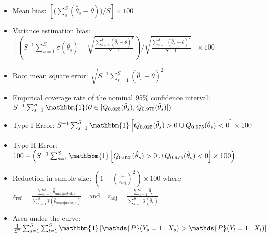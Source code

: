 \documentclass{article}
\begin{document}
  \begin{itemize}[itemsep=16pt]
 \item Mean bias: $  \left[ \big ( \sum_s^{S} (\hat{\theta}_s - \theta)   \big )   \big / S \right] \times 100$ 
  \item Variance estimation bias:  $\left[ \left( S^{-1} \sum_{s=1}^{S} \sigma(\hat{\theta}_s)  - \sqrt{\frac{\sum_{s=1}^{S} (\hat{\theta}_s - \theta)^2}{S-1}} \right) \big / \sqrt{\frac{\sum_{s=1}^{S} (\hat{\theta}_s - \theta)^2}{S-1}} \right] \times 100$
   \item Root mean square error:  $ \sqrt{S^{-1} \sum_{s=1}^{S} (\hat{\theta}_s - \theta)^2}$
    \item Empirical coverage rate of the nominal 95\% confidence interval:  $S^{-1} \sum_{s=1}^{S} \mathbbm{1}(\theta \in [Q_{0.025}(\hat{\theta}_s), Q_{0.975}(\hat{\theta}_s)])$
     \item Type I Error: $S^{-1} \sum_{s=1}^{S} \mathbbm{1}\left[Q_{0.025}(\hat{\theta}_s) > 0 \cup Q_{0.975}(\hat{\theta}_s) < 0\right] \times 100$
     \item Type II Error: $100 - \left(S^{-1} \sum_{s=1}^{S} \mathbbm{1}\left[Q_{0.025}(\hat{\theta}_s) > 0 \cup Q_{0.975}(\hat{\theta}_s) < 0\right] \times 100 \right)$
      \item Reduction in sample size: $\left(1 - \left(\frac{z_{\text{ref}}}{z_{\text{adj}}}\right)^2\right) \times 100$ where $z_{\text{ref}} = \frac{\sum_{s=1}^{S} \hat{\theta}_{\text{unadjusted}, s}}{\sum_{s=1}^{S} \hat{s}(\hat{\theta}_{\text{unadjusted}, s})}
\quad \text{and} \quad
z_{\text{adj}} = \frac{\sum_{s=1}^{S} \hat{\theta}_s}{\sum_{s=1}^{S} \hat{s}(\hat{\theta}_s)}$

      \item Area under the curve: $\frac{1}{S^2} \sum_{s=1}^{S} \sum_{l=1}^{S} \mathbbm{1}\left[\mathds{P}(Y_s=1 \mid X_s) > \mathds{P}(Y_l=1 \mid X_l)\right]$



 \end{itemize}
 
\end{document}
